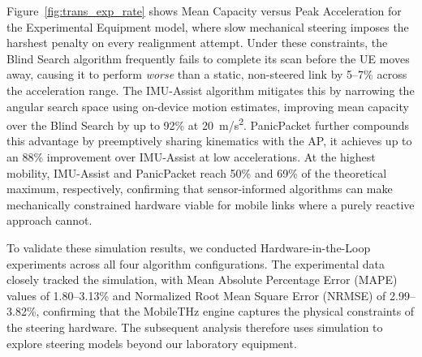 \documentclass[fleqn,10pt]{wlscirep}
\begin{document}

Figure~\ref{fig:trans_exp_rate} shows Mean Capacity versus Peak Acceleration for the Experimental Equipment model, where slow mechanical steering imposes the harshest penalty on every realignment attempt. Under these constraints, the Blind Search algorithm frequently fails to complete its scan before the UE moves away, causing it to perform \textit{worse} than a static, non-steered link by 5--7\% across the acceleration range. The IMU-Assist algorithm mitigates this by narrowing the angular search space using on-device motion estimates, improving mean capacity over the Blind Search by up to 92\% at \SI{20}{m/s^2}. PanicPacket further compounds this advantage by preemptively sharing kinematics with the AP, it achieves up to an 88\% improvement over IMU-Assist at low accelerations. At the highest mobility, IMU-Assist and PanicPacket reach 50\% and 69\% of the theoretical maximum, respectively, confirming that sensor-informed algorithms can make mechanically constrained hardware viable for mobile links where a purely reactive approach cannot.


To validate these simulation results, we conducted Hardware-in-the-Loop experiments across all four algorithm configurations. The experimental data closely tracked the simulation, with Mean Absolute Percentage Error (MAPE) values of 1.80--3.13\% and Normalized Root Mean Square Error (NRMSE) of 2.99--3.82\%, confirming that the MobileTHz engine captures the physical constraints of the steering hardware. The subsequent analysis therefore uses simulation to explore steering models beyond our laboratory equipment.
\end{document}

